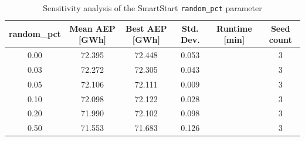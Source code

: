\begin{table}[H]
\centering
\caption{Sensitivity analysis of the SmartStart \texttt{random\_pct} parameter}
\label{tab:random_pct}

\begin{tabular}{cccccc}
\hline
random\_pct & Mean AEP [GWh] & Best AEP [GWh] & Std. Dev. & Runtime [min] & Seed count \\
\hline
0.00 & 72.395 & 72.448 & 0.053 &  & 3 \\
0.03 & 72.272 & 72.305 & 0.043 &  & 3 \\
0.05 & 72.106 & 72.111 & 0.009 &  & 3 \\
0.10 & 72.098 & 72.122 & 0.028 &  & 3 \\
0.20 & 71.990 & 72.102 & 0.098 &  & 3 \\
0.50 & 71.553 & 71.683 & 0.126 &  & 3 \\
\hline
\end{tabular}
\end{table}